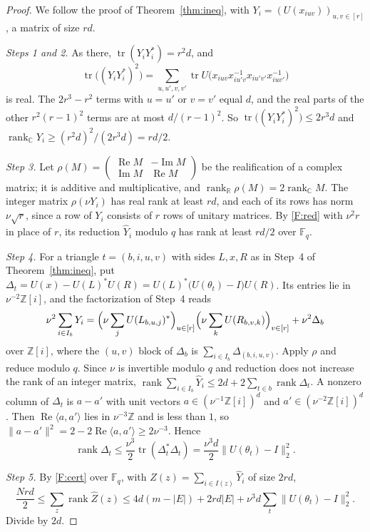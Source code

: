 \documentclass[11pt]{article}
\theoremstyle{definition}
\theoremstyle{remark}
\numberwithin{equation}{section}
\DeclareMathOperator{\rank}{rank}
\DeclareMathOperator{\tr}{tr}
\newcommand{\F}{\mathbb F}
\newcommand{\R}{\mathbb R}
\newcommand{\Z}{\mathbb Z}
\newcommand{\C}{\mathbb C}
\begin{document}
\begin{proof}
We follow the proof of Theorem~\ref{thm:ineq}, with $Y_i=(U(x_{iuv}))_{u,v\in[r]}$, a matrix of size $rd$.

\emph{Steps 1 and 2.} As there, $\tr(Y_iY_i^*)=r^2d$, and
\[
 \tr\bigl((Y_iY_i^*)^2\bigr)=\sum_{u,u',v,v'}\tr U\bigl(x_{iuv}x_{iu'v}^{-1}x_{iu'v'}x_{iuv'}^{-1}\bigr)
\]
is real. The $2r^3-r^2$ terms with $u=u'$ or $v=v'$ equal $d$, and the real parts of the other $r^2(r-1)^2$ terms are at most $d/(r-1)^2$. So $\tr\bigl((Y_iY_i^*)^2\bigr)\le2r^3d$ and $\rank_\C Y_i\ge(r^2d)^2/(2r^3d)=rd/2$.

\emph{Step 3.} Let $\rho(M)=\left(\begin{smallmatrix}\operatorname{Re}M&-\operatorname{Im}M\\ \operatorname{Im}M&\operatorname{Re}M\end{smallmatrix}\right)$ be the realification of a complex matrix; it is additive and multiplicative, and $\rank_\R\rho(M)=2\rank_\C M$. The integer matrix $\rho(\nu Y_i)$ has real rank at least $rd$, and each of its rows has norm $\nu\sqrt r$, since a row of $Y_i$ consists of $r$ rows of unitary matrices. By \ref{F:red} with $\nu^2r$ in place of $r$, its reduction $\widehat Y_i$ modulo $q$ has rank at least $rd/2$ over $\F_q$.

\emph{Step 4.} For a triangle $t=(b,i,u,v)$ with sides $L,x,R$ as in Step~4 of Theorem~\ref{thm:ineq}, put $\Delta_t=U(x)-U(L)^*U(R)=U(L)^*\bigl(U(\theta_t)-I\bigr)U(R)$. Its entries lie in $\nu^{-2}\Z[i]$, and the factorization of Step~4 reads
\[
 \nu^2\sum_{i\in I_b}Y_i=\Bigl(\nu\sum_jU(L_{b,u,j})^*\Bigr)_{u\in[r]}\Bigl(\nu\sum_kU(R_{b,v,k})\Bigr)_{v\in[r]}+\nu^2\Delta_b
\]
over $\Z[i]$, where the $(u,v)$ block of $\Delta_b$ is $\sum_{i\in I_b}\Delta_{(b,i,u,v)}$. Apply $\rho$ and reduce modulo $q$. Since $\nu$ is invertible modulo $q$ and reduction does not increase the rank of an integer matrix, $\rank\sum_{i\in I_b}\widehat Y_i\le2d+2\sum_{t\in b}\rank\Delta_t$. A nonzero column of $\Delta_t$ is $a-a'$ with unit vectors $a\in(\nu^{-1}\Z[i])^d$ and $a'\in(\nu^{-2}\Z[i])^d$. Then $\operatorname{Re}\langle a,a'\rangle$ lies in $\nu^{-3}\Z$ and is less than $1$, so $\|a-a'\|^2=2-2\operatorname{Re}\langle a,a'\rangle\ge2\nu^{-3}$. Hence
\[
 \rank\Delta_t\le\frac{\nu^3}{2}\tr(\Delta_t^*\Delta_t)=\frac{\nu^3d}{2}\|U(\theta_t)-I\|_2^2.
\]

\emph{Step 5.} By \ref{F:cert} over $\F_q$, with $\widehat Z(z)=\sum_{i\in I(z)}\widehat Y_i$ of size $2rd$,
\[
 \frac{Nrd}{2}\le\sum_z\rank\widehat Z(z)\le4d(m-|E|)+2rd|E|+\nu^3d\sum_t\|U(\theta_t)-I\|_2^2.
\]
Divide by $2d$.
\end{proof}
\end{document}
